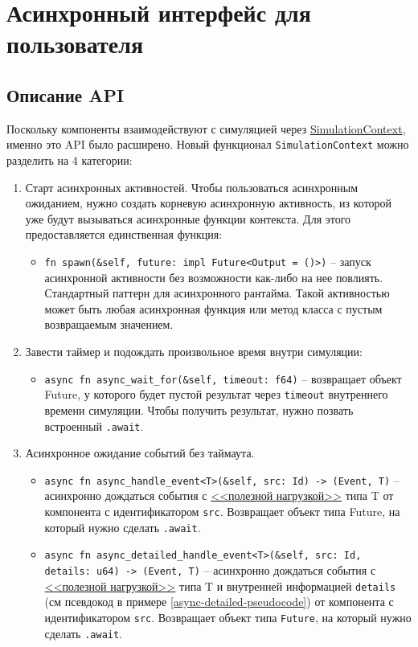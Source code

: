 \section{Асинхронный интерфейс для пользователя} \label{interface}

\subsection{Описание API}

Поскольку компоненты взаимодействуют с симуляцией через \hyperref[SimulationContext]{SimulationContext}, именно это API было расширено. Новый функционал \texttt{SimulationContext} можно разделить на 4 категории: 
\begin{enumerate}
    \item Старт асинхронных активностей. Чтобы пользоваться асинхронным ожиданием, нужно создать корневую асинхронную активность, из которой уже будут вызываться асинхронные функции контекста. Для этого предоставляется единственная функция: 
    \begin{itemize}
        \item \texttt{fn spawn(\&self, future: impl Future<Output = ()>)} -- запуск асинхронной активности без возможности как-либо на нее повлиять. Стандартный паттерн для асинхронного рантайма. Такой активностью может быть любая асинхронная функция или метод класса с пустым возвращаемым значением. \label{spawn}
    \end{itemize}
    \item Завести таймер и подождать произвольное время внутри симуляции: 
    \begin{itemize}
        \item \texttt{async fn async\_wait\_for(\&self, timeout: f64)} -- возвращает объект Future, у которого будет пустой результат через \texttt{timeout} внутреннего времени симуляции. Чтобы получить результат, нужно позвать встроенный \texttt{.await}.
    \end{itemize}
    \item Асинхронное ожидание событий без таймаута. 
    \begin{itemize}
        \item \texttt{async fn async\_handle\_event<T>(\&self, src: Id) -> (Event, T)} -- асинхронно дождаться события с \hyperref[Event:payload]{<<полезной нагрузкой>>} типа T от компонента с идентификатором \texttt{src}. Возвращает объект типа Future, на который нужно сделать \texttt{.await}.
        \item \texttt{async fn async\_detailed\_handle\_event<T>(\&self, src: Id, details: u64) -> (Event, T)} -- асинхронно дождаться события с \hyperref[Event:payload]{<<полезной нагрузкой>>} типа T и внутренней информацией \texttt{details} (см псевдокод в примере \ref{async-detailed-pseudocode}) от компонента с идентификатором \texttt{src}. Возвращает объект типа \texttt{Future}, на который нужно сделать \texttt{.await}.

\end{itemize}
\end{enumerate}
